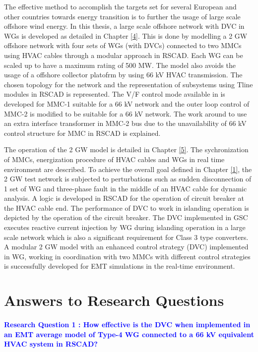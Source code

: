 The effective method to accomplish the targets set for several European and other countries towards energy transition is to further the usage of large scale offshore wind energy. In this thesis, a large scale offshore network with \gls{DVC} in \gls{WG}s is developed as detailed in Chapter \ref{4}. This is done by modelling a 2 GW offshore network with four sets of \gls{WG}s (with \gls{DVC}s) connected to two \gls{MMC}s using \gls{HVAC} cables through a modular approach in RSCAD. Each \gls{WG} can be scaled up to have a maximum rating of 500 MW. The model also avoids the usage of a offshore collector platofrm by using 66 kV \gls{HVAC} transmission. The chosen topology for the network and the representation of subsystems using Tline modules in RSCAD is represented. The V/F control mode available in \cite{wachal2014guide} is developed for \gls{MMC}-1 suitable for a 66 kV network and the outer loop control of \gls{MMC}-2 is modified to be suitable for a 66 kV network. The work around to use an extra interface transformer in \gls{MMC}-2 bus due to the unavailability of 66 kV control structure for \gls{MMC} in RSCAD is explained. 


The operation of the 2 GW model is detailed in Chapter \ref{5}. The sychronization of \gls{MMC}s, energization procedure of \gls{HVAC} cables and \gls{WG}s in real time environment are described. To achieve the overall goal defined in Chapter \ref{1}, the 2 GW test network is subjected to perturbations such as sudden disconnection of 1 set of \gls{WG} and three-phase fault in the middle of an \gls{HVAC} cable for dynamic analysis. A logic is developed in RSCAD for the operation of circuit breaker at the \gls{HVAC} cable end. The performance of \gls{DVC} to work in islanding operation is depicted by the operation of the circuit breaker. The \gls{DVC} implemented in \gls{GSC} executes reactive current injection by \gls{WG} during islanding operation in a large scale network which is also a significant requirement for Class 3 type converters. A modular 2 GW model with an enhanced control strategy (\gls{DVC}) implemented in \gls{WG}, working in coordination with two \gls{MMC}s with different control strategies is successfully developed for \gls{EMT} simulations in the real-time environment.   


\section{Answers to Research Questions}
\vspace{2mm}
\paragraph{\textcolor{blue}{Research Question 1 : How effective is the \gls{DVC} when implemented in an \gls{EMT} average model of Type-4 \gls{WG} connected to a 66 kV equivalent \gls{HVAC} system in RSCAD?}}

